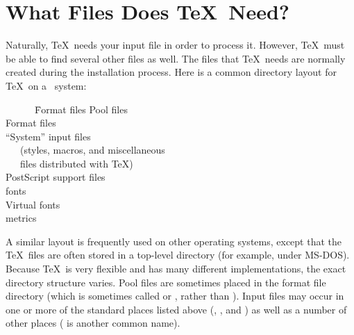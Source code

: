 \section{What Files Does \protect\TeX\ Need?}

Naturally, \TeX\ needs your input file in order to process it.
However, \TeX\ must be able to find several
other files as 
well.  The files that \TeX\ needs are normally created
during the installation process.  Here is a common directory layout for
\TeX\ on a \Unix\ system:

\begin{exindent}
\begin{tabbing}
\ \ \ \ \ \ \= Format files \kill
{}      \> Pool files \\[2pt]
   \> Format files \\[2pt]
    \> ``System'' input files \\
    \>\ \ \  (styles, macros, and miscellaneous\\
       \>\ \ \   files distributed with \TeX)\\[2pt]
        \> PostScript support files \\[2pt]
  \>  fonts\\[2pt]
  \> Virtual fonts\\[2pt]
 \>  metrics\\
\end{tabbing}
\end{exindent}

\vspace{-6pt}
A similar layout is frequently used on other operating systems,
except that the \TeX\ files are often stored in a top-level
directory (for example,  under MS-DOS).  Because \TeX\ is
very flexible and has many different implementations, the exact directory structure varies.  Pool files are sometimes
placed in the format file directory (which is sometimes called
 or , rather than ).
Input files may occur in one or more of the standard places listed above
(,
, and ) as well as a number of other
places ( is another common name).

